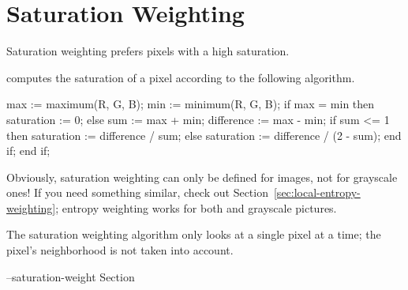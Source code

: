 

\section[Saturation Weighting]{Saturation Weighting
  \label{sec:saturation-weighting}
  }

Saturation weighting prefers pixels with a high saturation.

\App{} computes the saturation of a pixel according to the following
algorithm.

\begin{adalisting}
max := maximum(R, G, B);
min := minimum(R, G, B);
if max = min then
    saturation := 0;
else
    sum := max + min;
    difference := max - min;
    if sum <= 1 then
        saturation := difference / sum;
    else
        saturation := difference / (2 - sum);
    end if;
end if;
\end{adalisting}

Obviously, saturation weighting can only be defined for 
images, not for grayscale ones!  If you need something similar, check
out Section~\ref{sec:local-entropy-weighting}; entropy weighting works
for both  and grayscale pictures.

The saturation weighting algorithm only looks at a single pixel at a
time; the pixel's neighborhood is not taken into account.

\begin{optionsummary}
\item[--saturation-weight] Section~
\end{optionsummary}
